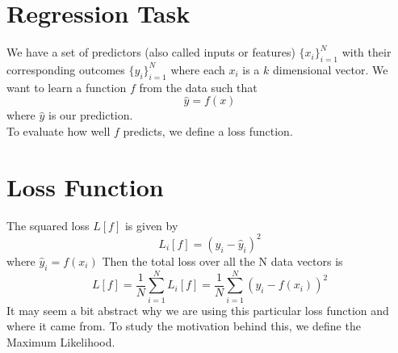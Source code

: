  \section{Regression Task}
We have a set of predictors (also called inputs or features) $\{x_{i}\}^{N}_{i=1}$ with their corresponding outcomes $\{y_{i}\}^{N}_{i=1}$ where each $x_{i}$ is a $k$ dimensional vector. We want to learn a function $f$ from the data such that 
\begin{equation}
\hat{y}=f(x)
\end{equation}
where $\hat{y}$ is our prediction.
\\To evaluate how well $f$ predicts, we define a loss function. 
\section{Loss Function}  
The squared loss $L[f]$ is given by
\begin{equation}
L_{i}[f]=(y_{i}-\hat{y}_{i})^{2}
\end{equation}
where $\hat{y}_{i} = f(x_{i})$
Then the total loss over all the N data vectors is
\begin{equation}
L[f]=\frac{1}{N}\sum_{i=1}^{N}{L_{i}[f]}=\frac{1}{N}\sum_{i=1}^{N}{(y_{i}-f(x_{i}))^{2}}
\end{equation}
It may seem a bit abstract why we are using this particular loss function and where it came from. To study the motivation behind this, we define the Maximum Likelihood. 
